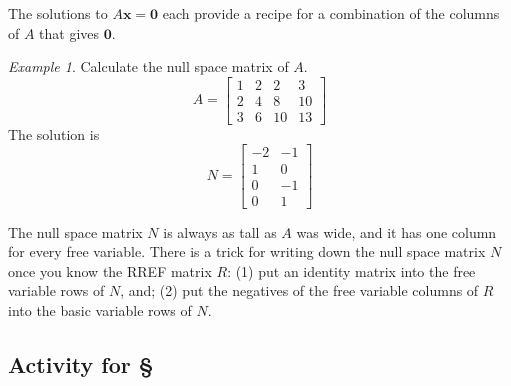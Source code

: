 \documentclass[11pt,oneside]{amsbook}
\theoremstyle{definition}
\theoremstyle{plain}
\theoremstyle{definition}
\theoremstyle{remark}
\newtheorem{example}[theorem]{Example}
\numberwithin{equation}{section}
\numberwithin{figure}{section}
\begin{document}
The solutions to $A\mathbf{x}=\mathbf{0}$ each provide a recipe for a combination of the columns of $A$ that gives $\mathbf{0}$.

\begin{example}
  Calculate the null space matrix of $A$.
  \[A=\begin{bmatrix}1&2&2&3\\2&4&8&10\\3&6&10&13\end{bmatrix}
  \]
  The solution is
  \[N=\begin{bmatrix}-2&-1\\1&0\\0&-1\\0&1\end{bmatrix}
  \]
\end{example}

The null space matrix $N$ is always as tall as $A$ was wide, and it has one column for every free variable. There is a trick for writing down the null space matrix $N$ once you know the RREF matrix $R$: (1) put an identity matrix into the free variable rows of $N$, and; (2) put the negatives of the free variable columns of $R$ into the basic variable rows of $N$.

\newpage
\subsection*{Activity for \S \thesection}
\end{document}
